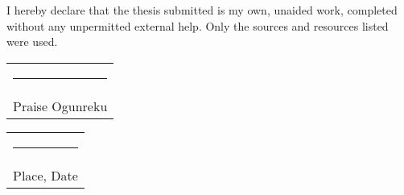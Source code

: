 
I hereby declare that the thesis submitted is my own, unaided work, completed without any unpermitted external help. Only the sources and resources listed were used.


\vspace*{4em}\noindent
\hfill%
\begin{tabular}[t]{c}
  \rule{10em}{0.4pt}\\ Praise Ogunreku
\end{tabular}%
\hfill%
\begin{tabular}[t]{c}
  \rule{10em}{0.4pt}\\ Place, Date
\end{tabular}%
\hfill\strut
